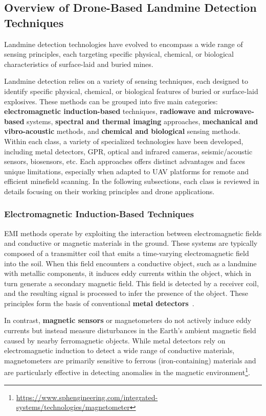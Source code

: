 \subsection{Overview of Drone-Based Landmine Detection Techniques}\label{sensor_overview}

Landmine detection technologies have evolved to encompass a wide range of sensing principles, each targeting specific physical, chemical, or biological characteristics of surface-laid and buried mines. 

Landmine detection relies on a variety of sensing techniques, each designed to identify specific physical, chemical, or biological features of buried or surface-laid explosives. These methods can be grouped into five main categories: \textbf{electromagnetic induction-based} techniques, \textbf{radiowave and microwave-based} systems, \textbf{spectral and thermal imaging} approaches, \textbf{mechanical and vibro-acoustic} methods, and \textbf{chemical and biological} sensing methods. Within each class, a variety of specialized technologies have been developed, including metal detectors, \gls{GPR}, optical and infrared cameras, seismic/acoustic sensors, biosensors, etc. Each approaches offers distinct advantages and faces unique limitations, especially when adapted to \gls{UAV} platforms for remote and efficient minefield scanning. In the following subsections, each class is reviewed in details focusing on their working principles and drone applications.



\subsubsection{Electromagnetic Induction-Based Techniques}\label{EMI}

\gls{EMI} methods operate by exploiting the interaction between electromagnetic fields and conductive or magnetic materials in the ground. These systems are typically composed of a transmitter coil that emits a time-varying electromagnetic field into the soil. When this field encounters a conductive object, such as a landmine with metallic components, it induces eddy currents within the object, which in turn generate a secondary magnetic field. This field is detected by a receiver coil, and the resulting signal is processed to infer the presence of the object. These principles form the basis of conventional \textbf{metal detectors}~\cite{gichd2006guidebook}.

In contrast, \textbf{magnetic sensors} or magnetometers do not actively induce eddy currents but instead measure disturbances in the Earth's ambient magnetic field caused by nearby ferromagnetic objects. While metal detectors rely on electromagnetic induction to detect a wide range of conductive materials, magnetometers are primarily sensitive to ferrous (iron-containing) materials and are particularly effective in detecting anomalies in the magnetic environment\footnote{\url{https://www.sphengineering.com/integrated-systems/technologies/magnetometer}}.

